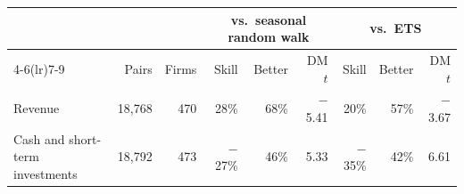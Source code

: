\begin{tabular}{lrrrrrrrr}
\toprule
 & & & \multicolumn{3}{c}{vs.\ seasonal random walk} & \multicolumn{3}{c}{vs.\ ETS} \\
\cmidrule(lr){4-6}\cmidrule(lr){7-9}
 & Pairs & Firms & Skill & Better & DM $t$ & Skill & Better & DM $t$ \\
\midrule
Revenue & 18{,}768 & 470 & 28\% & 68\% & $-$5.41 & 20\% & 57\% & $-$3.67 \\
Cash and short-term investments & 18{,}792 & 473 & $-$27\% & 46\% & 5.33 & $-$35\% & 42\% & 6.61 \\
\bottomrule
\end{tabular}
